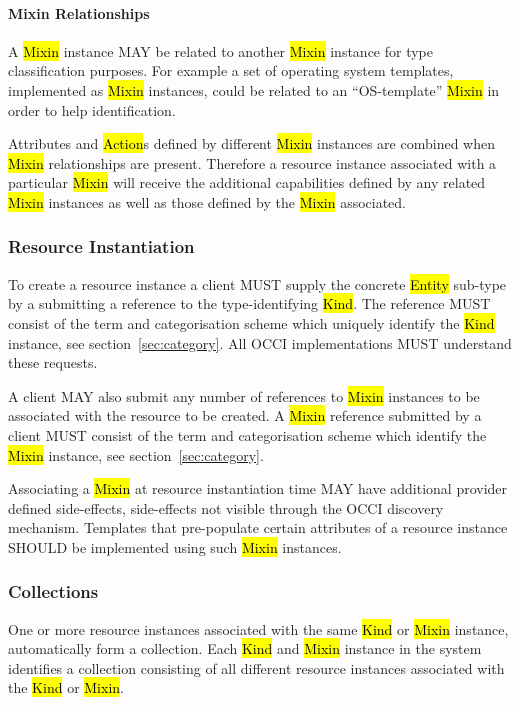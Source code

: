 \documentclass[10pt,a4paper]{article}
\begin{document}
\paragraph*{Mixin Relationships}

A \hl{Mixin} instance MAY be related to another \hl{Mixin} instance for
type classification purposes. For example a set of operating system templates,
implemented as \hl{Mixin} instances, could be related to an ``OS-template''
\hl{Mixin} in order to help identification.

Attributes and \hl{Action}s defined by different \hl{Mixin} instances are
combined when \hl{Mixin} relationships are present. Therefore a resource
instance associated with a particular \hl{Mixin} will receive the additional
capabilities defined by any related \hl{Mixin} instances as well as those
defined by the \hl{Mixin} associated.

\subsubsection{Resource Instantiation}
\label{sec:instantiation}
To create a resource instance a client MUST supply the concrete
\hl{Entity} sub-type by a submitting a reference to the type-identifying \hl{Kind}.
The reference MUST consist of the term and categorisation scheme which
uniquely identify the \hl{Kind} instance, see section~\ref{sec:category}.
All OCCI implementations MUST understand these requests.

A client MAY also submit any number of references to \hl{Mixin} instances to be
associated with the resource to be created. A \hl{Mixin} reference submitted by
a client MUST consist of the term and categorisation scheme which identify
the \hl{Mixin} instance, see section~\ref{sec:category}. 

Associating a \hl{Mixin} at resource
instantiation time MAY have additional provider defined side-effects,
side-effects not visible through the OCCI discovery mechanism. Templates that
pre-populate certain attributes of a resource instance SHOULD be implemented
using such \hl{Mixin} instances.

\subsubsection{Collections}
\label{sec:collection}
One or more resource instances associated with the same \hl{Kind} or \hl{Mixin}
instance, automatically form a collection.
Each \hl{Kind} and \hl{Mixin} instance in the system identifies a collection
consisting of all different resource instances associated with the \hl{Kind} or
\hl{Mixin}.
\end{document}
